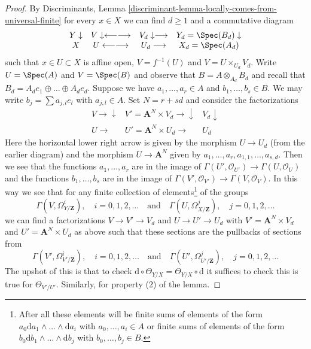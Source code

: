\begin{proof}
By Discriminants, Lemma
\ref{discriminant-lemma-locally-comes-from-universal-finite}
for every $x \in X$ we can find $d \geq 1$ and a commutative diagram
$$
\begin{array}{cccc}Y \downarrow & V \downarrow\longleftarrow\longrightarrow & V_d \downarrow\longrightarrow & Y_d = \Spec(B_d) \downarrow \\ X & U \longleftarrow\longrightarrow & U_d \longrightarrow & X_d = \Spec(A_d)\end{array}
$$
such that $x \in U \subset X$ is affine open, $V = f^{-1}(U)$
and $V = U \times_{U_d} V_d$. Write $U = \Spec(A)$ and $V = \Spec(B)$
and observe that $B = A \otimes_{A_d} B_d$ and recall that
$B_d = A_d e_1 \oplus \ldots \oplus A_d e_d$. Suppose we have
$a_1, \ldots, a_r \in A$ and $b_1, \ldots, b_s \in B$.
We may write $b_j = \sum a_{j, l} e_l$ with $a_{j, l} \in A$.
Set $N = r + sd$ and consider the factorizations
$$
\begin{array}{ccc}V \longrightarrow\downarrow & V' = \mathbf{A}^N \times V_d \longrightarrow\downarrow & V_d \downarrow \\ U \longrightarrow & U' = \mathbf{A}^N \times U_d \longrightarrow & U_d\end{array}
$$
Here the horizontal lower right arrow is given by the morphism
$U \to U_d$ (from the earlier diagram) and the morphism
$U \to \mathbf{A}^N$ given by $a_1, \ldots, a_r, a_{1, 1}, \ldots, a_{s, d}$.
Then we see that the functions $a_1, \ldots, a_r$ are in the image of
$\Gamma(U', \mathcal{O}_{U'}) \to \Gamma(U, \mathcal{O}_U)$
and the functions $b_1, \ldots, b_s$ are in the image of
$\Gamma(V', \mathcal{O}_{V'}) \to \Gamma(V, \mathcal{O}_V)$.
In this way we see that for any finite collection of elements\footnote{After
all these elements will be finite sums of elements of the form
$a_0 \text{d}a_1 \wedge \ldots \wedge \text{d}a_i$ with
$a_0, \ldots, a_i \in A$ or finite sums of elements of the form
$b_0 \text{d}b_1 \wedge \ldots \wedge \text{d}b_j$ with
$b_0, \ldots, b_j \in B$.} of the groups
$$
\Gamma(V, \Omega^i_{Y/\mathbf{Z}}),\quad i = 0, 1, 2, \ldots
\quad\text{and}\quad
\Gamma(U, \Omega^j_{X/\mathbf{Z}}),\quad j = 0, 1, 2, \ldots
$$
we can find a factorizations $V \to V' \to V_d$ and
$U \to U' \to U_d$ with $V' = \mathbf{A}^N \times V_d$ and
$U' = \mathbf{A}^N \times U_d$ as above
such that these sections are the pullbacks of sections from
$$
\Gamma(V', \Omega^i_{V'/\mathbf{Z}}),\quad i = 0, 1, 2, \ldots
\quad\text{and}\quad
\Gamma(U', \Omega^j_{U'/\mathbf{Z}}),\quad j = 0, 1, 2, \ldots
$$
The upshot of this is that to check
$\text{d} \circ \Theta_{Y/X} = \Theta_{Y/X} \circ \text{d}$
it suffices to check this is true for $\Theta_{V'/U'}$.
Similarly, for property (2) of the lemma.


\end{proof}
